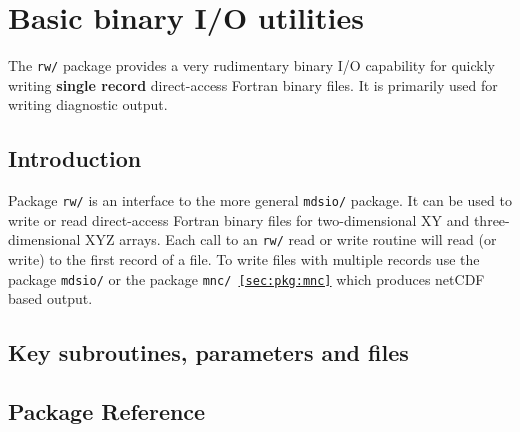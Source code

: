 \section{Basic binary I/O utilities}
\label{sec:pkg:rw}
The {\tt rw/} package provides a very rudimentary binary I/O capability
for quickly writing {\bf single record} direct-access Fortran binary files. 
It is primarily used for writing diagnostic output.
\subsection{Introduction}
Package {\tt rw/} is an interface to the more general {\tt mdsio/} package.
It can be used to write or read direct-access Fortran binary files for 
two-dimensional XY and three-dimensional XYZ arrays. Each call to an {\tt rw/}
read or write routine will read (or write) to the first record of a file.
To write files with multiple records use the package {\tt mdsio/} or the
package {\tt mnc/ \ref{sec:pkg:mnc}} which produces netCDF \cite{rew:97} 
based output.

\subsection{Key subroutines, parameters and files}
\label{sec:pkg:rw:implementation_synopsis}
\subsection{Package Reference}
